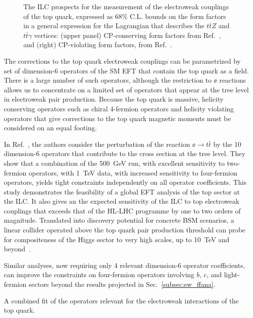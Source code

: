 \begin{figure}[tb]
\begin{center}
\caption{The ILC prospects for the measurement of the electroweak couplings of the top quark, expressed as 68\% C.L. bounds on the form factors in a general expression 
for the Lagrangian that describes the $t\bar{t}Z$ and $t\bar{t}\gamma$ vertices:
(upper panel) CP-conserving form factors from Ref.~\cite{Abramowicz:2016zbo}, 
and (right) CP-violating form factors, from Ref.~\cite{Bernreuther:2017cyi}.
\label{fig:top_ew_couplings}}
 \end{center}
 \vspace{-0.7cm}
 \end{figure}
 

The corrections to the top quark electroweak couplings can 
be parametrized by set of 
dimension-6 operators of the SM EFT that contain the top quark as a
field. There is a large number of such operators, although the
restriction to $\ee$ reactions allows us to concentrate on a limited
set of operators that appear at the tree level in electroweak pair
production.
Because the top quark is massive, helicity conserving operators such
as chiral 4-fermion operators and helicity violating operators that
give corrections to the top quark magnetic moments must be considered
on an equal footing. 

In 
Ref.~\cite{Durieux:2018tev}, the authors consider the
perturbation of the reaction $\ee\to t\bar t$ by the 10 dimension-6
operators that contribute to the cross section at the tree level.
They show that a 
combination of
 the 500~GeV run, with excellent sensitivity to two-fermion operators,
with 1~TeV{} data, with increased sensitivity to four-fermion
operators, yields  tight constraints independently on 
all operator coefficients.  This study demonstrates the feasibility of a global EFT analysis of the top sector
at the ILC.  It also gives an the expected sensitivity of the ILC to
top electroweak couplings that  exceeds that of the HL-LHC programme by one to two orders of
magnitude. Translated into discovery potential for concrete BSM scenarios, a linear collider operated above the top quark
pair production threshold can probe for compositeness of the Higgs
sector to very high scales, up to 10~TeV and
beyond~\cite{Durieux:2018ekg}. 


Similar analyses, now requiring  only 4 relevant dimension-6 operator coefficients, can
improve the constraints on four-fermion operators involving $b$, $c$,
and light-fermion sectors beyond the results projected in
Sec.~\ref{subsec:ew_ffana}.

A combined fit of the operators relevant for the electroweak interactions of the
top quark.


